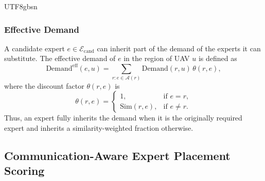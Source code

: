\documentclass[journal]{IEEEtran}
\begin{document}
\begin{CJK*}{UTF8}{gbsn}
\subsubsection{Effective Demand}
A candidate expert \(e \in \mathcal{E}_{\mathrm{cand}}\) can inherit part of the demand of the experts it can substitute. The effective demand of \(e\) in the region of UAV \(u\) is defined as
\begin{equation}
\mathrm{Demand}^{\mathrm{eff}}(e,u) = \sum_{r : e \in \mathcal{A}(r)} \mathrm{Demand}(r,u) \, \theta(r,e),
\label{eq:demand_eff}
\end{equation}
where the discount factor \(\theta(r,e)\) is
\begin{equation}
\theta(r,e) =
\begin{cases}
1, & \text{if } e = r, \\
\mathrm{Sim}(r,e), & \text{if } e \neq r.
\end{cases}
\label{eq:theta}
\end{equation}
Thus, an expert fully inherits the demand when it is the originally required expert and inherits a similarity-weighted fraction otherwise.


\subsection{Communication-Aware Expert Placement Scoring}\label{sec:placement_scoring}



\end{CJK*}
\end{document}
